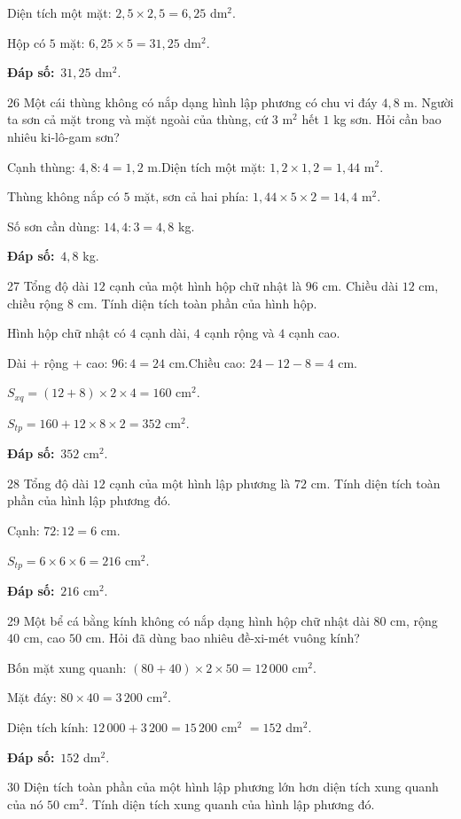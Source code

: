 \documentclass[11pt]{article}
\newif\ifsol \solfalse
\providecommand{\AnsWord}{Đáp số}
\newcommand{\dapso}[1]{\par\textbf{\AnsWord:}\ #1}
\newcommand{\probsol}[1]{%
  \begin{lrbox}{\solmeasure}\begin{minipage}{\dimexpr\linewidth-24pt\relax}#1\end{minipage}\end{lrbox}%
  \ifsol
    \begin{solbox}#1\end{solbox}%
  \else
    \setlength{\solht}{\dimexpr\ht\solmeasure+\dp\solmeasure+0.85cm\relax}%
    \ifdim\solht<1.35cm\setlength{\solht}{1.35cm}\fi
    \begin{tcolorbox}[colback=white,colframe=Line,boxrule=0.8pt,arc=5pt,
      left=8pt,right=8pt,top=4pt,bottom=4pt,height=\solht]{\footnotesize\color{Slate}\itshape\WorkWord}\end{tcolorbox}%
  \fi}
\newcommand{\gap}{\vspace{0.3cm}}
\def\WorkWord{Bài làm:}
\def\AnsWord{Đáp số}
\begin{document}
\probsol{
Diện tích một mặt: $2{,}5\times2{,}5=6{,}25$ dm$^2$.\par
Hộp có $5$ mặt: $6{,}25\times5=31{,}25$ dm$^2$.
\dapso{$31{,}25$ dm$^2$.}}
\gap
\begin{probbox}{26}{\relax}
Một cái thùng không có nắp dạng hình lập phương có chu vi đáy $4{,}8$ m. Người ta sơn cả mặt trong và mặt ngoài của thùng, cứ $3$ m$^2$ hết $1$ kg sơn. Hỏi cần bao nhiêu ki-lô-gam sơn?
\end{probbox}
\probsol{
Cạnh thùng: $4{,}8:4=1{,}2$ m.\quad Diện tích một mặt: $1{,}2\times1{,}2=1{,}44$ m$^2$.\par
Thùng không nắp có $5$ mặt, sơn cả hai phía: $1{,}44\times5\times2=14{,}4$ m$^2$.\par
Số sơn cần dùng: $14{,}4:3=4{,}8$ kg.
\dapso{$4{,}8$ kg.}}
\gap
\begin{probbox}{27}{\relax}
Tổng độ dài $12$ cạnh của một hình hộp chữ nhật là $96$ cm. Chiều dài $12$ cm, chiều rộng $8$ cm. Tính diện tích toàn phần của hình hộp.
\end{probbox}
\probsol{
Hình hộp chữ nhật có $4$ cạnh dài, $4$ cạnh rộng và $4$ cạnh cao.\par
Dài $+$ rộng $+$ cao: $96:4=24$ cm.\quad Chiều cao: $24-12-8=4$ cm.\par
$S_{xq}=(12+8)\times2\times4=160$ cm$^2$.\par
$S_{tp}=160+12\times8\times2=352$ cm$^2$.
\dapso{$352$ cm$^2$.}}
\gap
\begin{probbox}{28}{\relax}
Tổng độ dài $12$ cạnh của một hình lập phương là $72$ cm. Tính diện tích toàn phần của hình lập phương đó.
\end{probbox}
\probsol{
Cạnh: $72:12=6$ cm.\par
$S_{tp}=6\times6\times6=216$ cm$^2$.
\dapso{$216$ cm$^2$.}}
\gap
\begin{probbox}{29}{\relax}
Một bể cá bằng kính không có nắp dạng hình hộp chữ nhật dài $80$ cm, rộng $40$ cm, cao $50$ cm. Hỏi đã dùng bao nhiêu đề-xi-mét vuông kính?
\end{probbox}
\probsol{
Bốn mặt xung quanh: $(80+40)\times2\times50=12\,000$ cm$^2$.\par
Mặt đáy: $80\times40=3\,200$ cm$^2$.\par
Diện tích kính: $12\,000+3\,200=15\,200$ cm$^2$ $=152$ dm$^2$.
\dapso{$152$ dm$^2$.}}
\gap
\begin{probbox}{30}{\relax}
Diện tích toàn phần của một hình lập phương lớn hơn diện tích xung quanh của nó $50$ cm$^2$. Tính diện tích xung quanh của hình lập phương đó.
\end{probbox}
\end{document}
